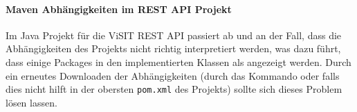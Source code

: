 \paragraph{Maven Abhängigkeiten im REST API Projekt}

Im Java Projekt für die ViSIT REST API passiert ab und an der Fall, dass die Abhängigkeiten des Projekts nicht richtig interpretiert werden, was dazu führt, dass einige Packages in den implementierten Klassen als  angezeigt werden. Durch ein erneutes Downloaden der Abhängigkeiten (durch das Kommando \texttt{} oder falls dies nicht hilft \texttt{} in der obersten \texttt{pom.xml} des Projekts) sollte sich dieses Problem lösen lassen.